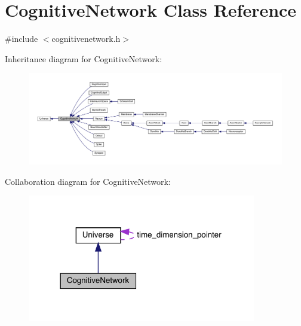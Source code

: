 \hypertarget{class_cognitive_network}{}\section{Cognitive\+Network Class Reference}
\label{class_cognitive_network}


{\ttfamily \#include $<$cognitivenetwork.\+h$>$}



Inheritance diagram for Cognitive\+Network\+:\nopagebreak
\begin{figure}[H]
\begin{center}
\leavevmode
\includegraphics[width=350pt]{class_cognitive_network__inherit__graph}
\end{center}
\end{figure}


Collaboration diagram for Cognitive\+Network\+:
\nopagebreak
\begin{figure}[H]
\begin{center}
\leavevmode
\includegraphics[width=283pt]{class_cognitive_network__coll__graph}
\end{center}
\end{figure}
